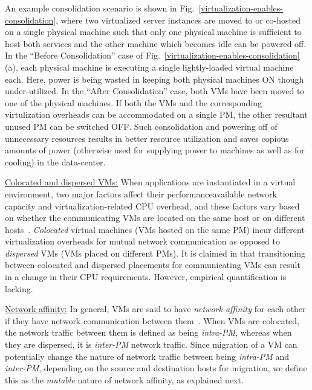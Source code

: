 An example consolidation scenario is shown in Fig.~\ref{virtualization-enables-consolidation}, 
where two virtualized server instances are moved to or co-hosted on a single physical machine 
such that only one physical machine is sufficient to host both services and
the other machine which becomes idle can be powered off.
In the ``Before Consolidation'' case of Fig.~\ref{virtualization-enables-consolidation}(a), 
each physical machine is executing a single lightly-loaded virtual machine each. 
Here, power is being wasted in keeping both physical
machines ON though under-utilized. In the ``After Consolidation'' case,
both VMs have been moved to one of the physical machines. 
If both the VMs and the corresponding virtulization overheads can be accommodated
on a single PM,
the other resultant unused PM can be switched OFF. Such consolidation and
powering off of unnecessary resources results in better resource
utilization and saves copious amounts of power
(otherwise used for supplying power to machines as well as for cooling) in
the data-center.

\underline{Colocated and dispersed VMs:} When applications are 
instantiated in a virtual
environment, two major factors affect their performance\textemdash{}available
network capacity and virtualization-related CPU overhead,
and these factors vary based on whether the communicating VMs
are located on the same host or on different hosts~\cite{virtual-putty}.
\emph{Colocated} 
virtual machines (VMs 
hosted on the same PM) incur 
different virtualization overheads for mutual network
communication as opposed to \emph{dispersed} VMs 
(VMs placed on different PMs).
It is claimed in \cite{virtual-putty} that transitioning
between colocated and dispersed placements for communicating VMs
can result in a change in their CPU requirements. However, empirical
quantification is lacking.

\underline{Network affinity:} In general, VMs are said to have
\textit{network-affinity}
for each other if they have 
network communication between them~\cite{virtual-putty, starling}.
When VMs are colocated, the network traffic between them
is defined as being \textit{intra-PM}, whereas when they are dispersed,
it is \textit{inter-PM} network traffic.
Since migration of a VM can potentially change the nature of network
traffic between being \textit{intra-PM} and \textit{inter-PM}, depending 
on the source and destination hosts for migration, we define this
as the \textit{mutable} nature of network affinity, as explained next.

